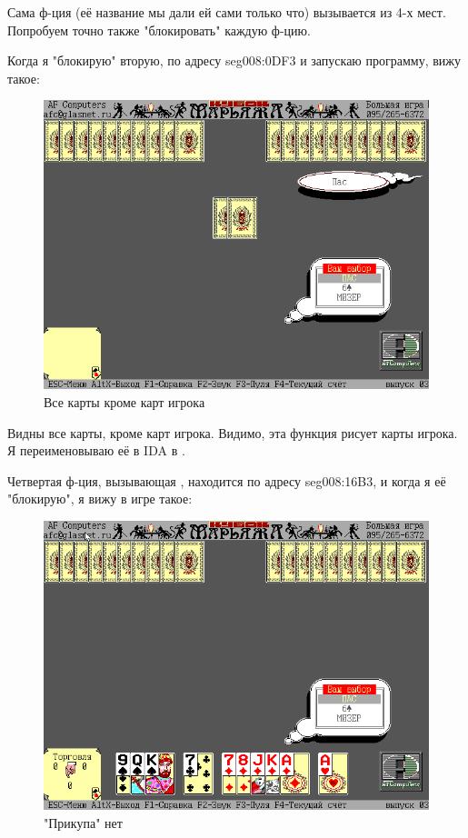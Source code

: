 Сама ф-ция  (её название мы дали ей сами только что) вызывается из 4-х мест.
Попробуем точно также "блокировать" каждую ф-цию.

Когда я "блокирую" вторую, по адресу seg008:0DF3 и запускаю программу, вижу такое:

\begin{figure}[H]
\centering
\includegraphics[scale=\FigScale]{examples/marriage/draw_players_cards.png}
\caption{Все карты кроме карт игрока}
\end{figure}

Видны все карты, кроме карт игрока. Видимо, эта функция рисует карты игрока. \\
Я переименовываю её в IDA в .

Четвертая ф-ция, вызывающая , находится по адресу seg008:16B3, и когда я её "блокирую",
я вижу в игре такое:

\begin{figure}[H]
\centering
\includegraphics[scale=\FigScale]{examples/marriage/no_prikup.png}
\caption{"Прикупа" нет}
\end{figure}

